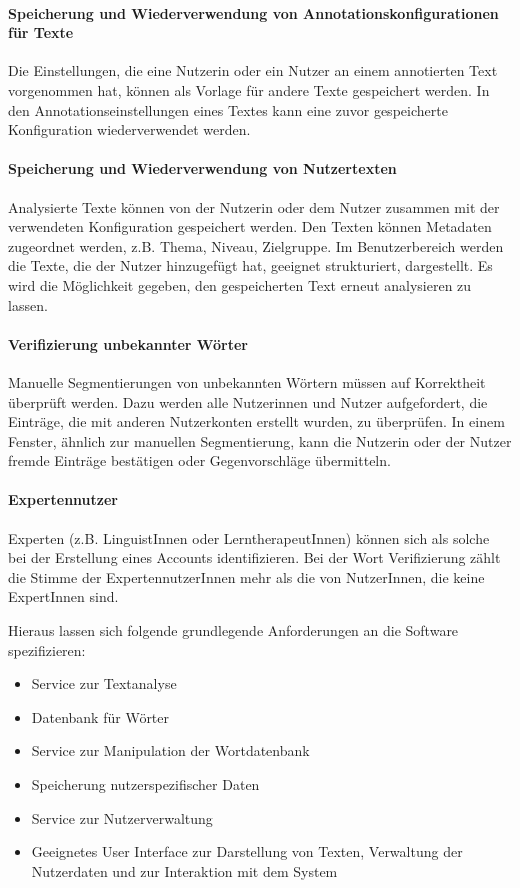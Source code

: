 \paragraph{Speicherung und Wiederverwendung von Annotationskonfigurationen für Texte}
Die Einstellungen, die eine Nutzerin oder ein Nutzer an einem annotierten Text vorgenommen hat, können als Vorlage für andere Texte gespeichert werden. In den Annotationseinstellungen eines Textes kann eine zuvor gespeicherte Konfiguration wiederverwendet werden.

\paragraph{Speicherung und Wiederverwendung von Nutzertexten}
Analysierte Texte können von der Nutzerin oder dem Nutzer zusammen mit der verwendeten Konfiguration gespeichert werden. Den Texten können Metadaten zugeordnet werden, z.B. Thema, Niveau, Zielgruppe. Im Benutzerbereich werden die Texte, die der Nutzer hinzugefügt hat, geeignet strukturiert, dargestellt. Es wird die Möglichkeit gegeben, den gespeicherten Text erneut analysieren zu lassen.

\paragraph{Verifizierung unbekannter Wörter}
Manuelle Segmentierungen von unbekannten Wörtern müssen auf Korrektheit überprüft werden. Dazu werden alle Nutzerinnen und Nutzer aufgefordert, die Einträge, die mit anderen Nutzerkonten erstellt wurden, zu überprüfen. In einem Fenster, ähnlich zur manuellen Segmentierung, kann die Nutzerin oder der Nutzer fremde Einträge bestätigen oder Gegenvorschläge übermitteln.

\paragraph{Expertennutzer}
Experten (z.B. LinguistInnen oder LerntherapeutInnen) können sich als solche bei der Erstellung eines Accounts identifizieren. Bei der Wort Verifizierung zählt die Stimme der ExpertennutzerInnen mehr als die von NutzerInnen, die keine ExpertInnen sind.

Hieraus lassen sich folgende grundlegende Anforderungen an die Software spezifizieren:

\begin{itemize}
	\item Service zur Textanalyse
	\item Datenbank für Wörter
	\item Service zur Manipulation der Wortdatenbank
	\item Speicherung nutzerspezifischer Daten
	\item Service zur Nutzerverwaltung
	\item Geeignetes User Interface zur Darstellung von Texten, Verwaltung der Nutzerdaten und zur Interaktion mit dem System
\end{itemize}

